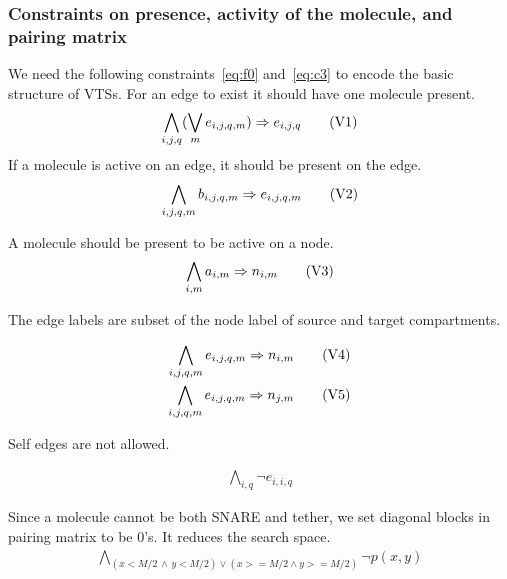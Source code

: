 \subsubsection{Constraints on presence, activity of the molecule, and pairing matrix}
%
We need the following constraints~\eqref{eq:f0} and~\eqref{eq:c3}
to encode the basic structure of VTSs.
%
For an edge to exist it should have one molecule present. 
%
\begin{align}
  \bigwedge\limits_{i,j,q} (\bigvee_m e_{i,j,q,m} )\Rightarrow e_{i,j,q}\tag{V1}\label{eq:f0}
\end{align}
If a molecule is active on an edge, it should be present on the edge.
%
\begin{align}
  \bigwedge\limits_{i,j,q,m} b_{i,j,q,m} \Rightarrow e_{i,j,q,m}\tag{V2}\label{eq:f1}
\end{align}

A molecule should be present to be active on a node.  
\begin{align}
  \bigwedge\limits_{i,m} a_{i,m} \Rightarrow n_{i,m}
  \tag{V3}\label{eq:c4}
\end{align}

The edge labels are subset of the node label of source and target compartments.

\begin{align}
  \bigwedge\limits_{i,j,q,m} e_{i,j,q,m} \Rightarrow n_{i,m}\tag{V4}\label{eq:c0}\\
  \bigwedge\limits_{i,j,q,m}  e_{i,j,q,m} \Rightarrow n_{j,m}\tag{V5}\label{eq:c1}
\end{align}


Self edges are not allowed. 

\begin{align}
   \bigwedge\limits_{i,q} \neg e_{i,i,q}\tag{V6}\label{eq:c2}
\end{align}

Since a molecule cannot be both SNARE and tether,
we set diagonal blocks in pairing matrix to be 0's.
It reduces the search space.
\begin{align}
  \bigwedge\limits_{(x < M/2 \, \land  \, y < M/2) \lor  (x >= M/2 \land y >= M/2)} \neg p(x,y)
  \tag{V7}\label{eq:c3}
\end{align}

